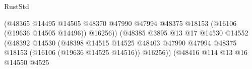 \begin{lexlean}{RustStd}
\begin{coremodule}
                                                                  (@48365
                                                                    @14495
                                                                    @14505
                                                                    @48370
                                                                    @47990
                                                                    @47994
                                                                    @48375
                                                                    @18153
                                                                    (@16106 (@19636 @14505 @14496))
                                                                    @16256))
                                                                (@48385
                                                                  @3895
                                                                  @13
                                                                  @17
                                                                  @14530
                                                                  @14552
                                                                  (@48392
                                                                    @14530
                                                                    (@48398
                                                                      @14515
                                                                      @14525
                                                                      @48403
                                                                      @47990
                                                                      @47994
                                                                      @48375
                                                                      @18153
                                                                      (@16106
                                                                        (@19636 @14525 @14516))
                                                                      @16256))
                                                                  (@48416
                                                                    @114
                                                                    @13
                                                                    @16
                                                                    @14550
                                                                    @4525

\end{coremodule}
\end{lexlean}
